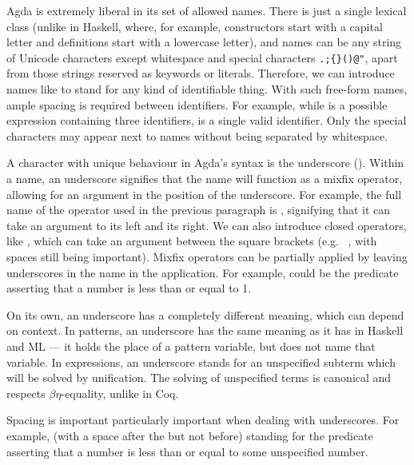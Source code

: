 Agda is extremely liberal in its set of allowed names.
There is just a single lexical class (unlike in Haskell, where, for example,
constructors start with a capital letter and definitions start with a lowercase
letter), and names can be any string of Unicode characters except whitespace and
special characters \verb|.;{}()@"|, apart from those strings reserved as
keywords or literals.
Therefore, we can introduce names like
to stand for any kind of identifiable thing.
With such free-form names, ample spacing is required between identifiers.
For example, while \AgdaSpace{}\AgdaDatatype{$\leq$}\AgdaSpace{}%
 is a possible expression containing three
identifiers,  is a single
valid identifier.
Only the special characters may appear next to names without being separated by
whitespace.

A character with unique behaviour in Agda's syntax is the underscore
(\AgdaSymbol{\_}).
Within a name, an underscore signifies that the name will function as a mixfix
operator, allowing for an argument in the position of the underscore.
For example, the full name of the \AgdaDatatype{$\leq$} operator used in the
previous paragraph is \AgdaDatatype{\_$\leq$\_}, signifying that it can take an
argument to its left and its right.
We can also introduce closed operators, like \AgdaDatatype{[\_]}, which can take
an argument between the square brackets (e.g.\ \AgdaDatatype{[}\AgdaSpace{}%
\AgdaSpace{}\AgdaDatatype{]}, with spaces still being important).
Mixfix operators can be partially applied by leaving underscores in the name in
the application.
For example, \AgdaDatatype{\_$\leq$}\AgdaSpace{} could be the
predicate asserting that a number is less than or equal to 1.

On its own, an underscore has a completely different meaning, which can depend
on context.
In patterns, an underscore has the same meaning as it has in Haskell and ML ---
it holds the place of a pattern variable, but does not name that variable.
In expressions, an underscore stands for an unspecified subterm which will be
solved by unification.
The solving of unspecified terms is canonical and respects $\beta\eta$-equality,
unlike in Coq.

Spacing is important particularly important when dealing with underscores.
For example,
\AgdaDatatype{\_$\leq$}\AgdaSpace{}\AgdaSymbol{\_} (with a space after the
\AgdaDatatype{$\leq$} but not before) standing for the predicate asserting that
a number is less than or equal to some unspecified number.


